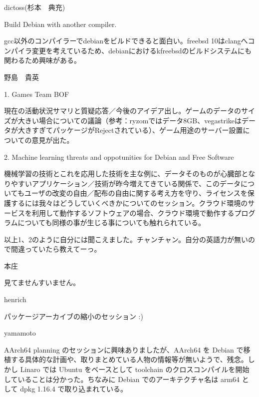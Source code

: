 
\begin{prework}{ dictoss(杉本　典充) }

Build Debian with another compiler.

gcc以外のコンパイラーでdebianをビルドできると面白い。freebsd 10はclangへコンパイラ変更を考えているため、debianにおけるkfreebsdのビルドシステムにも関わるため興味がある。
\end{prework}

\begin{prework}{ 野島　貴英 }

1. Games Team BOF

 現在の活動状況サマリと質疑応答／今後のアイデア出し。ゲームのデータのサイズが大きい場合についての議論（参考：ryzomではデータ8GB、vegastrikeはデータが大きすぎてパッケージがRejectされている）、ゲーム用途のサーバー設置についての意見が出た。

2. Machine learning threats and oppotunities for Debian and Free
 Software

  機械学習の技術とこれを応用した技術を主な例に、データそのものが心臓部となりやすいアプリケーション／技術が昨今増えてきている関係で、このデータについてもユーザの改変の自由／配布の自由に関する考え方を守り、ライセンスを保護するには我々はどうしていくべきかについてのセッション。クラウド環境のサービスを利用して動作するソフトウェアの場合、クラウド環境で動作するプログラムについても同様の事が生じる事についても触れられている。

以上1、2のように自分には聞こえました。チャンチャン。自分の英語力が無いので間違っていたら教えてーっ。
\end{prework}

\begin{prework}{ 本庄 }

見てませんすいません。
\end{prework}

\begin{prework}{ henrich }

パッケージアーカイブの縮小のセッション :)
\end{prework}

\begin{prework}{ yamamoto }

AArch64 planning のセッションに興味ありましたが、AArch64 を Debian で移植する具体的な計画や、取りまとめている人物の情報等が無いようで、残念。しかし Linaro では Ubuntu をベースとして toolchain のクロスコンパイルを開始していることは分かった。ちなみに Debian でのアーキテクチャ名は arm64 として dpkg 1.16.4 で取り込まれている。
\end{prework}

